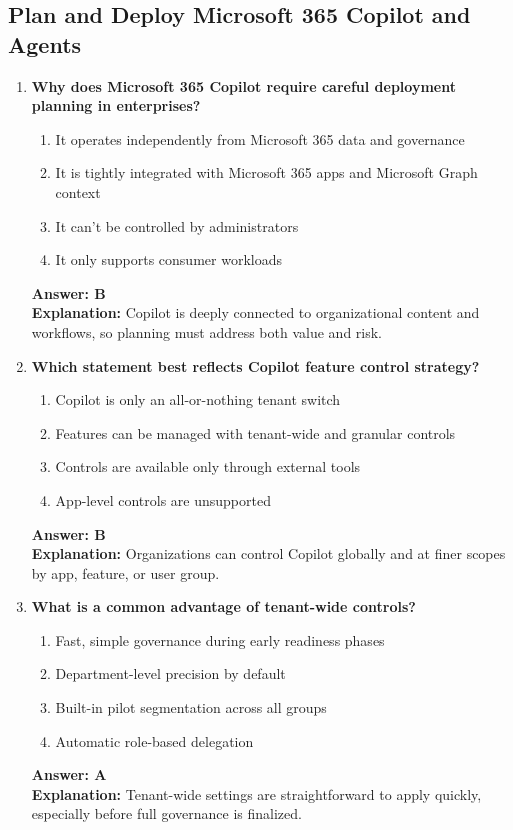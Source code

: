 \documentclass[10pt]{article}
\begin{document}
\subsection{Plan and Deploy Microsoft 365 Copilot and Agents}
\begin{enumerate}[leftmargin=*]

\item \textbf{Why does Microsoft 365 Copilot require careful deployment planning in enterprises?}
\begin{enumerate}[label=\Alph*.]
  \item It operates independently from Microsoft 365 data and governance
  \item It is tightly integrated with Microsoft 365 apps and Microsoft Graph context
  \item It can’t be controlled by administrators
  \item It only supports consumer workloads
\end{enumerate}
\textbf{Answer: B}\\
\textbf{Explanation:} Copilot is deeply connected to organizational content and workflows, so planning must address both value and risk.

\item \textbf{Which statement best reflects Copilot feature control strategy?}
\begin{enumerate}[label=\Alph*.]
  \item Copilot is only an all-or-nothing tenant switch
  \item Features can be managed with tenant-wide and granular controls
  \item Controls are available only through external tools
  \item App-level controls are unsupported
\end{enumerate}
\textbf{Answer: B}\\
\textbf{Explanation:} Organizations can control Copilot globally and at finer scopes by app, feature, or user group.

\item \textbf{What is a common advantage of tenant-wide controls?}
\begin{enumerate}[label=\Alph*.]
  \item Fast, simple governance during early readiness phases
  \item Department-level precision by default
  \item Built-in pilot segmentation across all groups
  \item Automatic role-based delegation
\end{enumerate}
\textbf{Answer: A}\\
\textbf{Explanation:} Tenant-wide settings are straightforward to apply quickly, especially before full governance is finalized.


\end{enumerate}
\end{document}
